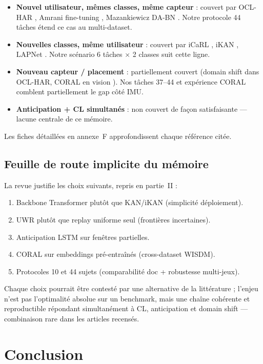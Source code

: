 \documentclass[a4paper,12pt]{report}
\begin{document}
\begin{itemize}
  \item \textbf{Nouvel utilisateur, mêmes classes, même capteur} : couvert par
  OCL-HAR \parencite{schiemer2023}, Amrani fine-tuning \parencite{amrani2025},
  Mazankiewicz DA-BN \parencite{mazankiewicz2020}. Notre protocole 44 tâches
  étend ce cas au multi-dataset.
  \item \textbf{Nouvelles classes, même utilisateur} : couvert par iCaRL
  \parencite{rebuffi2017}, iKAN \parencite{liu2024}, LAPNet
  \parencite{adaimi2022}. Notre scénario 6 tâches $\times$ 2 classes suit
  cette ligne.
  \item \textbf{Nouveau capteur / placement} : partiellement couvert (domain
  shift dans OCL-HAR, CORAL en vision \parencite{sun2016}). Nos tâches 37--44
  et expérience CORAL comblent partiellement le gap côté IMU.
  \item \textbf{Anticipation + CL simultanés} : non couvert de façon satisfaisante
  — lacune centrale de ce mémoire.
\end{itemize}

Les fiches détaillées en annexe~F approfondissent chaque référence citée.

\subsection{Feuille de route implicite du mémoire}

La revue justifie les choix suivants, repris en partie~II :
\begin{enumerate}
  \item Backbone Transformer plutôt que KAN/iKAN (simplicité déploiement).
  \item UWR plutôt que replay uniforme seul (frontières incertaines).
  \item Anticipation LSTM sur fenêtres partielles.
  \item CORAL sur embeddings pré-entraînés (cross-dataset WISDM).
  \item Protocoles 10 et 44 sujets (comparabilité doc + robustesse multi-jeux).
\end{enumerate}

Chaque choix pourrait être contesté par une alternative de la littérature ; l'enjeu
n'est pas l'optimalité absolue sur un benchmark, mais une chaîne cohérente et
reproductible répondant simultanément à CL, anticipation et domain shift — combinaison
rare dans les articles recensés.

\section{Conclusion}
\end{document}
